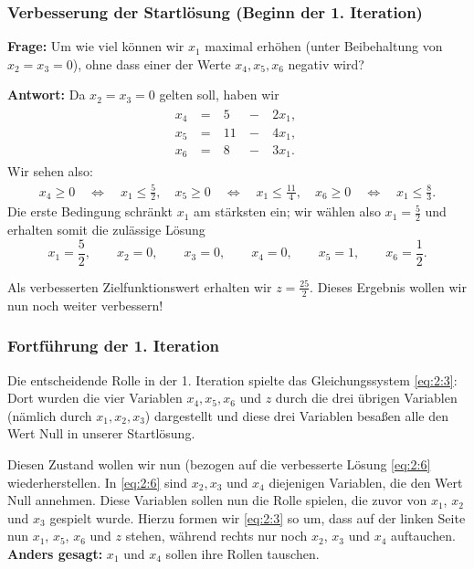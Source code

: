 \documentclass[smaller]{beamer}
\begin{document}
\begin{frame}
 \frametitle{Verbesserung der Startlösung (Beginn der 1. Iteration)} 
 \textbf{Frage:} Um wie viel können wir $x_1$ maximal erhöhen (unter Beibehaltung von $x_2=x_3=0$), ohne dass einer der Werte $x_4, x_5, x_6$ negativ wird?

 \textbf{Antwort:} Da $x_2=x_3=0$ gelten soll, haben wir
\begin{align*}
 \begin{alignedat}{3}
 x_4 &\ = &\  5 &\ - &\ 2x_1,\ \\
 x_5 &\ = &\ 11 &\ - &\ 4x_1,\ \\
 x_6 &\ = &\  8 &\ - &\ 3x_1.\
 \end{alignedat}
\end{align*}
Wir sehen also:
\begin{align*}
  x_4 \ge 0 \quad \Leftrightarrow \quad x_1 \leq \frac{5}{2}, \quad
  x_5 \ge 0 \quad \Leftrightarrow \quad x_1 \leq \frac{11}{4}, \quad
  x_6 \ge 0 \quad \Leftrightarrow \quad x_1 \leq \frac{8}{3}.
\end{align*}
 Die erste Bedingung schränkt $x_1$ am stärksten ein; wir wählen also $x_1 = \frac{5}{2}$ und erhalten somit die zulässige Lösung
\begin{equation}
\label{eq:2:6}
x_1=\frac{5}{2}, \qquad x_2=0, \qquad x_3=0, \qquad x_4=0, \qquad  x_5=1, \qquad x_6=\frac{1}{2}.
\end{equation}

Als verbesserten Zielfunktionswert erhalten wir \alert{$z = \frac{25}{2}$.} Dieses Ergebnis wollen wir nun noch weiter verbessern!
\end{frame}

\begin{frame}
 \frametitle{Fortführung der 1. Iteration}
 Die entscheidende Rolle in der 1. Iteration spielte das Gleichungssystem \eqref{eq:2:3}: Dort wurden die vier Variablen $x_4,x_5,x_6$ und $z$ durch die drei übrigen Variablen (nämlich durch $x_1,x_2,x_3$) dargestellt und diese drei Variablen besaßen alle den Wert Null in unserer Startlösung.

Diesen Zustand wollen wir nun (bezogen auf die verbesserte Lösung \eqref{eq:2:6} wiederherstellen. In \eqref{eq:2:6} sind $x_2, x_3$ und $x_4$ diejenigen Variablen, die den Wert Null annehmen. Diese Variablen sollen nun die Rolle spielen, die zuvor von $x_1$, $x_2$ und $x_3$ gespielt wurde. Hierzu formen wir \eqref{eq:2:3} so um, dass auf der linken Seite nun $x_1$, $x_5$, $x_6$ und $z$ stehen, während rechts nur noch $x_2$, $x_3$ und $x_4$ auftauchen.\\
\vspace*{0.2cm}
\textbf{Anders gesagt:} $x_1$ und $x_4$ sollen ihre Rollen tauschen.
\end{frame}
\end{document}
